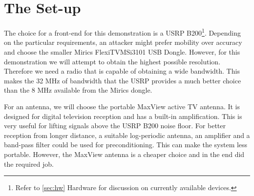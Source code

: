 \documentclass[a4paper,12pt,twoside,openright]{report}
\begin{document}
\section{The Set-up}

The choice for a front-end for this demonstration is a USRP B200\footnote{Refer to \ref{sec:hw} Hardware for discussion on currently available devices.}. Depending on the particular requirements, an attacker might prefer mobility over accuracy and choose the smaller Mirics FlexiTV\texttrademark MSi3101 USB Dongle. However, for this demonstration we will attempt to obtain the highest possible resolution. Therefore we need a radio that is capable of obtaining a wide bandwidth. This makes the 32 MHz of bandwidth that the USRP provides a much better choice than the 8 MHz available from the Mirics dongle.

For an antenna, we will choose the portable MaxView active TV antenna. It is designed for digital television reception and has a built-in amplification. This is very useful for lifting signals above the USRP B200 noise floor. For better reception from longer distance, a suitable log-periodic antenna, an amplifier and a band-pass filter could be used for preconditioning. This can make the system less portable. However, the MaxView antenna is a cheaper choice and in the end did the required job.
\end{document}
